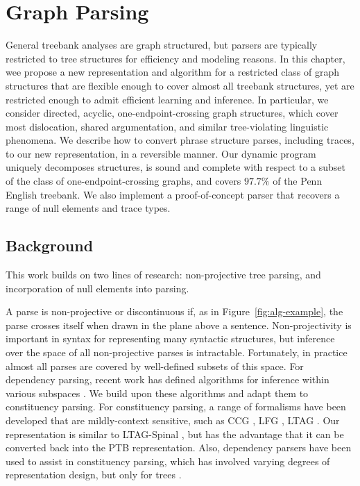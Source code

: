 \chapter{Graph Parsing}

General treebank analyses are graph structured, but parsers are typically restricted to tree structures for efficiency and modeling reasons.
In this chapter, wee propose a new representation and algorithm for a restricted class of graph structures that are flexible enough to cover almost all treebank structures, yet are restricted enough to admit efficient learning and inference.
In particular, we consider directed, acyclic, one-endpoint-crossing graph structures, which cover most dislocation, shared argumentation, and similar tree-violating linguistic phenomena.
We describe how to convert phrase structure parses, including traces, to our new representation, in a reversible manner.
Our dynamic program uniquely decomposes structures, is sound and complete with respect to a subset of the class of one-endpoint-crossing graphs, and covers $97.7\%$ of the Penn English treebank.
We also implement a proof-of-concept parser that recovers a range of null elements and trace types.

\section{Background}

This work builds on two lines of research: non-projective tree parsing, and incorporation of null elements into parsing.

A parse is non-projective or discontinuous if, as in Figure~\ref{fig:alg-example}, the parse crosses itself when drawn in the plane above a sentence.
Non-projectivity is important in syntax for representing many syntactic structures, but inference over the space of all non-projective parses is intractable.
Fortunately, in practice almost all parses are covered by well-defined subsets of this space.
For dependency parsing, recent work has defined algorithms for inference within various subspaces \parencite{Gomez-Rodriguez:2010,ec}.
We build upon these algorithms and adapt them to constituency parsing.
For constituency parsing, a range of formalisms have been developed that are mildly-context sensitive, such as CCG \parencite{Steedman:2000}, LFG \parencite{Bresnan:1982}, LTAG \parencite{Joshi:1997}.
Our representation is similar to LTAG-Spinal \parencite{Shen:2007}, but has the advantage that it can be converted back into the PTB representation.
Also, dependency parsers have been used to assist in constituency parsing, which has involved varying degrees of representation design, but only for trees \parencite{hall2007hybrid,hall-nivre:2008:PaGe,kong-rush-smith:2015:NAACL-HLT,fernandezgonzalez-martins:2015:ACL-IJCNLP}.

